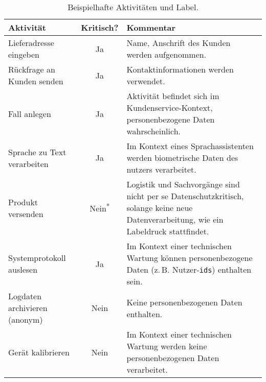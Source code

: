 \begin{table}[htbp]
    \centering
    \caption{Beispielhafte Aktivitäten und Label.}
    \begin{tabularx}{\textwidth}{p{} c p{}}
        \toprule
        Aktivität & Kritisch? & Kommentar \\
        \midrule
        Lieferadresse eingeben & Ja & Name, Anschrift des Kunden werden aufgenommen. \\
        Rückfrage an Kunden senden & Ja & Kontaktinformationen werden verwendet. \\
        Fall anlegen & Ja & Aktivität befindet sich im Kundenservice-Kontext, personenbezogene Daten wahrscheinlich. \\
        Sprache zu Text verarbeiten & Ja & Im Kontext eines Sprachassistenten werden biometrische Daten des nutzers verarbeitet. \\
        Produkt versenden & Nein\textsuperscript{*} & Logistik und Sachvorgänge sind nicht per se Datenschutzkritisch, solange keine neue Datenverarbeitung, wie ein Labeldruck stattfindet. \\
        Systemprotokoll auslesen & Ja & Im Kontext einer technischen Wartung können personenbezogene Daten (z.\,B. Nutzer-\texttt{ids}) enthalten sein. \\
        Logdaten archivieren (anonym) & Nein & Keine personenbezogenen Daten enthalten. \\
        Gerät kalibrieren & Nein & Im Kontext einer technischen Wartung werden keine personenbezogenen Daten verarbeitet. \\
        \bottomrule
    \end{tabularx}
    \label{tab:labeling-examples}
\end{table}